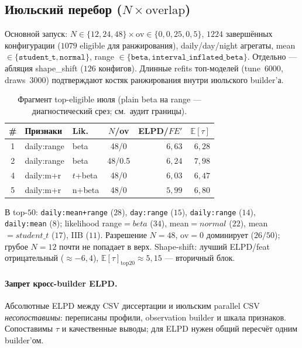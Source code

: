 \documentclass{article}
\begin{document}
\subsection{Июльский перебор ($N\times\mathrm{overlap}$)}

Основной запуск: $N\in\{12,24,48\}\times\mathrm{ov}\in\{0,0{,}25,0{,}5\}$,
$1224$ завершённых конфигурации ($1079$ eligible для ранжирования),
daily/day/night агрегаты, mean $\in\{\texttt{student\_t},\texttt{normal}\}$,
range $\in\{\texttt{beta},\texttt{interval\_inflated\_beta}\}$. Отдельно ---
абляция shape\_shift ($126$ конфигов). Длинные refits топ-моделей
(tune~$6000$, draws~$3000$) подтверждают костяк ранжирования внутри
июльского builder'а.

\begin{table}[t]
\centering
\caption{Фрагмент top-eligible июля (plain beta на range ---
диагностический срез; см.\ аудит границы).}
\label{tab:july-top}
\small
\begin{tabular}{cllcrr}
\toprule
\# & Признаки & Lik. & $N$/ov & ELPD/$F E'$ & $\mathbb{E}[\tau]$\\
\midrule
1 & daily:range & beta & 48/0 & $6{,}63$ & $6{,}28$\\
2 & daily:range & beta & 48/0.5 & $6{,}24$ & $7{,}98$\\
4 & daily:m+r & $t$+beta & 48/0 & $6{,}03$ & $6{,}47$\\
5 & daily:m+r & n+beta & 48/0 & $5{,}99$ & $6{,}80$\\
\bottomrule
\end{tabular}
\end{table}

В top-$50$: \texttt{daily:mean+range} ($28$), \texttt{day:range} ($15$),
\texttt{daily:range} ($14$), \texttt{daily:mean} ($8$); likelihood
range${=}beta$ ($34$), mean${=}normal$ ($22$), mean${=}student\_t$ ($17$),
IIB ($11$). Разрешение $N{=}48$, $\mathrm{ov}{=}0$ доминирует
($26/50$); грубое $N{=}12$ почти не попадает в верх. Shape-shift:
лучший ELPD/feat отрицательный ($\approx -6{,}4$),
$\mathbb{E}[\tau]_{\mathrm{top20}}\approx 5{,}15$ --- вторичный блок.

\paragraph{Запрет кросс-builder ELPD.}
Абсолютные ELPD между CSV диссертации и июльским parallel CSV
\emph{несопоставимы}: переписаны профили, observation builder и шкала
признаков. Сопоставимы $\tau$ и качественные выводы; для ELPD нужен
общий пересчёт одним builder'ом.
\end{document}
